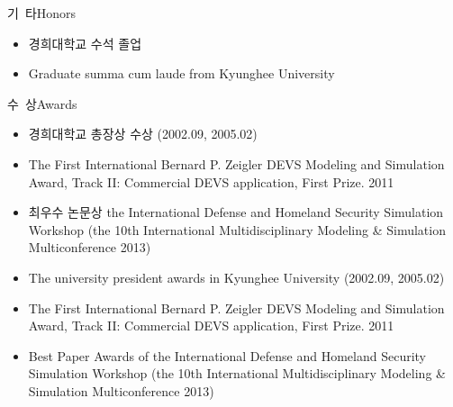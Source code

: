 \documentclass[english,full]{resume_structure}
\begin{document}
\begin{Others} %

\ResumeSubSection %
    {기\ 타}{Honors}
    {}
    {
      \begin{itemize}
         \item 경희대학교 수석 졸업
      \end{itemize}
    }
    {
      \begin{itemize}
        \item Graduate summa cum laude from Kyunghee University
      \end{itemize}
    }

\ResumeSubSection %
    {수\ 상}{Awards}
    {}
    {
      \begin{itemize}
          \item 경희대학교 총장상 수상 (2002.09, 2005.02) 
          \item The First International Bernard P. Zeigler DEVS Modeling and Simulation Award, Track II: Commercial DEVS application, First Prize. 2011
          \item 최우수 논문상 the International Defense and Homeland Security Simulation Workshop (the 10th International Multidisciplinary Modeling \& Simulation Multiconference 2013) 
      \end{itemize}
    }
    {
      \begin{itemize}
        \item The university president awards in Kyunghee University (2002.09, 2005.02) 
        \item The First International Bernard P. Zeigler DEVS Modeling and Simulation Award, Track II: Commercial DEVS application, First Prize. 2011
        \item Best Paper Awards of the International Defense and Homeland Security Simulation Workshop (the 10th International Multidisciplinary Modeling \& Simulation Multiconference 2013) 
      \end{itemize}
    }


\end{Others}
\end{document}
